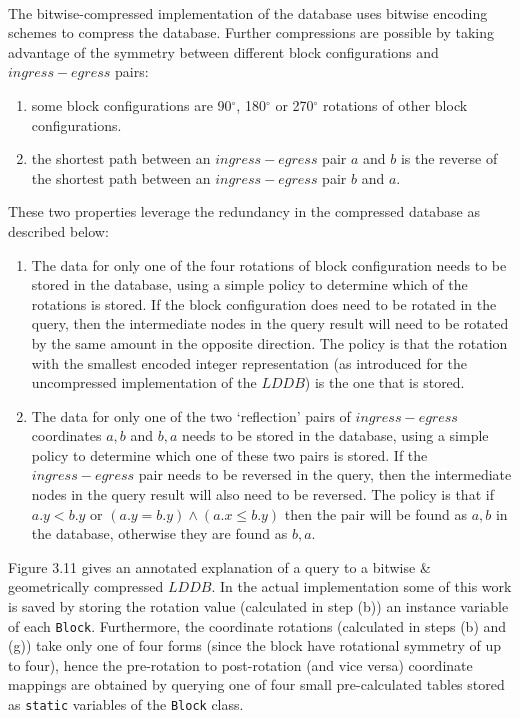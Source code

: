 \documentclass[12pt,notitlepage]{report}
\begin{document}
\\
\noindent
The bitwise-compressed implementation of the database uses bitwise encoding schemes to compress the database. Further compressions are possible by taking advantage of the symmetry between different block configurations and $ingress-egress$ pairs:
\begin{enumerate}
\item some block configurations are 90$^{\circ}$,  180$^{\circ}$ or 270$^{\circ}$ rotations of other block configurations.
\item the shortest path between an $ingress-egress$ pair $a$ and $b$ is the reverse of the shortest path between an $ingress-egress$ pair $b$ and $a$. 
\end{enumerate}

These two properties leverage the redundancy in the compressed database as described below:
\begin{enumerate}
\item The data for only one of the four rotations of block configuration needs to be stored in the database, using a simple policy  to determine which of the rotations is stored. If the block configuration does need to be rotated in the query, then the intermediate nodes in the query result will need to be rotated by the same amount in the opposite direction. The policy is that the rotation with the smallest encoded integer representation (as introduced for the uncompressed implementation of the $LDDB$) is the one that is stored. 
\item The data for only one of the two `reflection' pairs of $ingress-egress$ coordinates $a,b$ and $b,a$ needs to be stored in the database, using a simple policy to determine which one of these two pairs is stored. If the $ingress-egress$ pair needs to be reversed in the query, then the intermediate nodes in the query result will also need to be reversed. The policy is that if $a.y < b.y$ or $(a.y = b.y) \land (a.x \leq b.y)$ then the pair will be found as $a,b$ in the database, otherwise they are found as $b,a$.
\end{enumerate}

\noindent
Figure 3.11 gives an annotated explanation of a query to a bitwise \& geometrically compressed $LDDB$. In the actual implementation some of this work is saved by storing the rotation value (calculated in step (b)) an instance variable of each {\tt Block}. Furthermore, the coordinate rotations (calculated in steps (b) and (g)) take only one of four forms (since the block have rotational symmetry of up to four), hence the pre-rotation to post-rotation (and vice versa) coordinate mappings are obtained by querying one of four small pre-calculated tables stored as {\tt static} variables of the {\tt Block} class.\\
\end{document}
